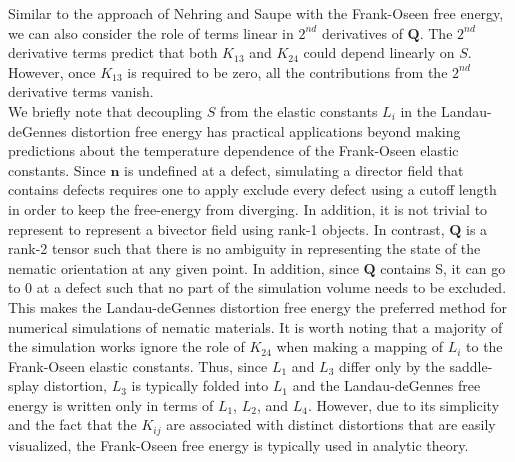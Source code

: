 Similar to the approach of Nehring and Saupe with the Frank-Oseen free energy, we can also consider the role of terms linear in $2^{nd}$ derivatives of $\mathbf{Q}$.
The $2^{nd}$ derivative terms predict that both $K_{13}$ and $K_{24}$ could depend linearly on $S$.
However, once $K_{13}$ is required to be zero, all the contributions from the $2^{nd}$ derivative terms vanish.\\


We briefly note that decoupling $S$ from the elastic constants $L_i$ in the Landau-deGennes distortion free energy has practical applications beyond making predictions about the temperature dependence of the Frank-Oseen elastic constants.
Since $\mathbf{n}$ is undefined at a defect, simulating a director field that contains defects requires one to apply exclude every defect using a cutoff length in order to keep the free-energy from diverging.
In addition, it is not trivial to represent to represent a bivector field using rank-1 objects.
In contrast, $\mathbf{Q}$ is a rank-2 tensor such that there is no ambiguity in representing the state of the nematic orientation at any given point.
In addition, since $\mathbf{Q}$ contains S, it can go to 0 at a defect such that no part of the simulation volume needs to be excluded.
This makes the Landau-deGennes distortion free energy the preferred method for numerical simulations of nematic materials.
It is worth noting that a majority of the simulation works ignore the role of $K_{24}$ when making a mapping of $L_i$ to the Frank-Oseen elastic constants.
Thus, since $L_1$ and $L_3$ differ only by the saddle-splay distortion, $L_3$ is typically folded into $L_1$ and the Landau-deGennes free energy is written only in terms of $L_1$, $L_2$, and $L_4$.
However, due to its simplicity and the fact that the $K_{ij}$ are associated with distinct distortions that are easily visualized, the Frank-Oseen free energy is typically used in analytic theory.\\


